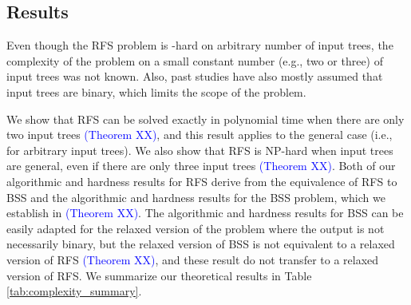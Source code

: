 \documentclass[twocolumn]{bmcart}%
\theoremstyle{mystyle}
\theoremstyle{proofstyle}
\begin{document}
\subsection{Results}
Even though the RFS problem is \NP-hard on arbitrary number of input trees, the complexity of the problem on a small constant number (e.g., two or three) of input trees was not known. Also, past studies have also mostly assumed that input trees are binary, which limits the scope of the problem. 

We show that RFS can be solved exactly in polynomial time when there are only two input trees 
\textcolor{blue}{(Theorem XX)},
and this result applies to the general case (i.e., for arbitrary input trees).
We also show that RFS is NP-hard when input trees are general, even if there are only three input trees 
\textcolor{blue}{(Theorem XX)}. 
Both of our algorithmic and hardness results for RFS derive from the equivalence of RFS to BSS and the algorithmic and hardness results for the BSS problem, which we establish in \textcolor{blue}{(Theorem XX)}. 
The algorithmic and hardness results for BSS can be easily adapted for the relaxed version of the problem where the output is not necessarily binary, but the relaxed version of BSS is not equivalent to a relaxed version of RFS 
\textcolor{blue}{(Theorem XX)}, and these result do not transfer to a relaxed version of RFS. We summarize our theoretical results in Table \ref{tab:complexity_summary}.
\end{document}
